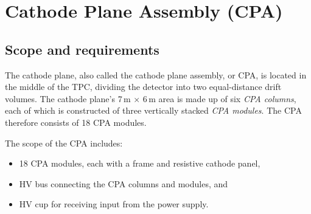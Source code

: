 


\section{Cathode Plane Assembly (CPA)}
\label{sec:cpa}

\subsection{Scope and requirements}

The cathode plane, also called the cathode plane assembly, or CPA, is located in the middle of the TPC, dividing the detector into two equal-distance drift volumes. The cathode plane's 7\,m $\times$ 6\,m area is made up of six \textit{CPA columns}, each of which is constructed of three vertically stacked \textit{CPA modules}. The CPA therefore consists of 18 CPA modules. 

The scope of the CPA includes:

\begin{itemize}
\item 18 CPA modules, each with a frame and resistive cathode panel, 
\item HV bus connecting the CPA columns and modules, and
\item HV cup for receiving input from the power supply.
\end{itemize}


